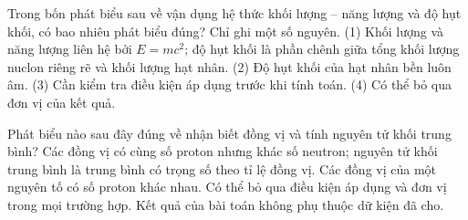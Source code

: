 \begin{ex}
Trong bốn phát biểu sau về vận dụng hệ thức khối lượng – năng lượng và độ hụt khối, có bao nhiêu phát biểu đúng? Chỉ ghi một số nguyên. (1) Khối lượng và năng lượng liên hệ bởi $E=mc^2$; độ hụt khối là phần chênh giữa tổng khối lượng nuclon riêng rẽ và khối lượng hạt nhân. (2) Độ hụt khối của hạt nhân bền luôn âm. (3) Cần kiểm tra điều kiện áp dụng trước khi tính toán. (4) Có thể bỏ qua đơn vị của kết quả.
\end{ex}

\begin{ex}
Phát biểu nào sau đây đúng về nhận biết đồng vị và tính nguyên tử khối trung bình?
\choice
{\True Các đồng vị có cùng số proton nhưng khác số neutron; nguyên tử khối trung bình là trung bình có trọng số theo tỉ lệ đồng vị.}
{Các đồng vị của một nguyên tố có số proton khác nhau.}
{Có thể bỏ qua điều kiện áp dụng và đơn vị trong mọi trường hợp.}
{Kết quả của bài toán không phụ thuộc dữ kiện đã cho.}
\end{ex}


